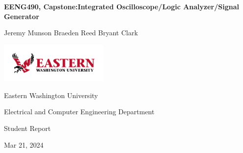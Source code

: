 	\thispagestyle{empty}
	\begin{center}
		\vspace*{1cm}
		\Huge
		\textbf{EENG490, Capstone:\linebreak \linebreak Integrated Oscilloscope/Logic Analyzer/Signal Generator}
		\vspace{0.5cm}
		\LARGE
		\vspace{1.5cm}

		Jeremy Munson
		Braeden Reed
		Bryant Clark

		\vfill

		\includegraphics[width=0.4\textwidth]{EWULogo.png}

		\Large

		Eastern Washington University

		Electrical and Computer Engineering Department

		Student Report

		Mar 21, 2024

	\end{center}
	\newpage
